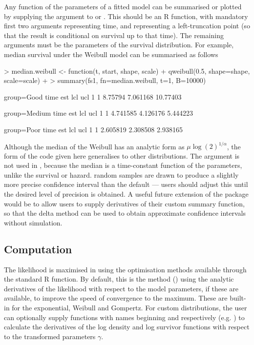 \documentclass[nojss,nofooter]{jss}
\begin{document}
Any function of the parameters of a fitted model can be summarised or plotted by
supplying the argument  to  or
.  This should be an R function, with mandatory
first two arguments  representing time, and 
representing a left-truncation point (so that the result is
conditional on survival up to that time). The remaining arguments must
be the parameters of the survival distribution.  For example, median 
survival under the Weibull model  can be summarised as follows
\begin{Schunk}
\begin{Sinput}
> median.weibull <- function(t, start, shape, scale) { 
+     qweibull(0.5, shape=shape, scale=scale) 
+ }
> summary(fs1, fn=median.weibull, t=1, B=10000)
\end{Sinput}
\begin{Soutput}
group=Good 
  time     est      lcl      ucl
1    1 8.75794 7.061168 10.77403

group=Medium 
  time      est      lcl      ucl
1    1 4.741585 4.126176 5.444223

group=Poor 
  time      est      lcl      ucl
1    1 2.605819 2.308508 2.938165
\end{Soutput}
\end{Schunk}
Although the median of the Weibull has an analytic form as $\mu
\log(2)^{1/\alpha}$, the form of the code given here generalises to
other distributions.
The argument  is not used in , because
the median is a time-constant function of the parameters, unlike the
survival or hazard.   random samples are drawn to produce
a slightly more precise confidence interval than the default --- users
should adjust this until the desired level of precision is obtained.
A useful future extension of the package would be to allow users to 
supply derivatives of their custom summary function, so that the 
delta method can be used to obtain approximate confidence intervals 
without simulation.


\subsection{Computation}

The likelihood is maximised in  using the
optimisation methods available through the standard R 
function.  By default, this is the  method (\citep{nash})
using the analytic derivatives of the likelihood with respect to the
model parameters, if these are available, to improve the speed of
convergence to the maximum.  These are built-in for the exponential,
Weibull and Gompertz.  %
For custom distributions, the user can optionally supply functions
with names beginning  and  respectively
(e.g. ) to calculate the derivatives of
the log density and log survivor functions with respect to the
transformed parameters $\gamma$.
\end{document}
